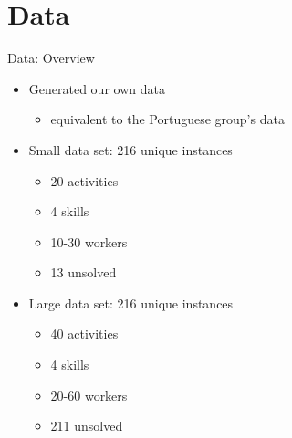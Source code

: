 \documentclass{beamer}
\begin{document}
\section{Data}
\begin{frame}{Data: Overview}
	\begin{itemize}
		\pause
		\item Generated our own data
		\begin{itemize}
			\item equivalent to the Portuguese group's data\pause
		\end{itemize}
		\vspace{2mm}
		\item Small data set: 216 unique instances
		\begin{itemize}
			\item 20 activities
			\vspace{1mm}
			\item 4 skills
			\vspace{1mm}
			\item 10-30 workers\pause
			\vspace{1mm}
			\item \alert{13 unsolved}\pause
		\end{itemize}
		\vspace{2mm}
		\item Large data set: 216 unique instances
		\begin{itemize}
			\item 40 activities
			\vspace{1mm}
			\item 4 skills
			\vspace{1mm}
			\item 20-60 workers\pause
			\vspace{1mm}
			\item \alert{211 unsolved}
		\end{itemize}
	\end{itemize}
\end{frame}
\end{document}
